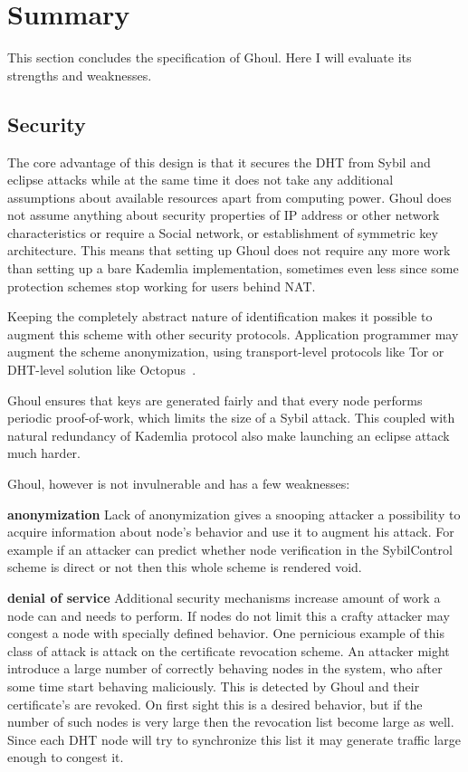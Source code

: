 \section{Summary}
\label{sec:ghoul_summary}
  This section concludes the specification of Ghoul. Here I will evaluate its
  strengths and weaknesses.
  
  \subsection{Security}
  The core advantage of this design is that it secures the DHT from Sybil and
  eclipse attacks while at the same time it does not take any additional
  assumptions about available resources apart from computing power. Ghoul does
  not assume anything about security properties of IP address or other network
  characteristics or require a Social network, or establishment of symmetric key
  architecture.  This means that setting up Ghoul does not require any more work
  than setting up a bare Kademlia implementation, sometimes even less since some
  protection schemes stop working for users behind NAT.

  Keeping the completely abstract nature of identification makes it possible to
  augment this scheme with other security protocols. Application programmer may
  augment the scheme anonymization, using transport-level protocols like Tor or
  DHT-level solution like Octopus~\cite{wan12b}.

  Ghoul ensures that keys are generated fairly and that every node performs
  periodic proof-of-work, which limits the size of a Sybil attack. This coupled
  with natural redundancy of Kademlia protocol also make launching an eclipse
  attack much harder.

  Ghoul, however is not invulnerable and has a few weaknesses:

  \begin{description}
    \item{\textbf{anonymization}} Lack of anonymization gives a snooping
      attacker a possibility to acquire information about node's behavior and
      use it to augment his attack. For example if an attacker can predict
      whether node verification in the SybilControl scheme is direct or not then
      this whole scheme is rendered void.
    \item{\textbf{denial of service}} Additional security mechanisms increase
      amount of work a node can and needs to perform. If nodes do not limit this
      a crafty attacker may congest a node with specially defined behavior. One
      pernicious example of this class of attack is attack on the certificate
      revocation scheme. An attacker might introduce a large number of correctly
      behaving nodes in the system, who after some time start behaving
      maliciously. This is detected by Ghoul and their certificate's are
      revoked. On first sight this is a desired behavior, but if the number of
      such nodes is very large then the revocation list become large as well.
      Since each DHT node will try to synchronize this list it may generate
      traffic large enough to congest it.
  \end{description}

